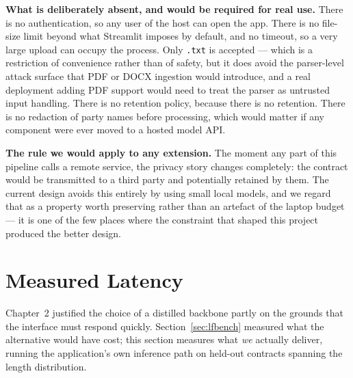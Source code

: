 \textbf{What is deliberately absent, and would be required for real use.} There is no authentication, so any user of the host can open the app. There is no file-size limit beyond what Streamlit imposes by default, and no timeout, so a very large upload can occupy the process. Only \texttt{.txt} is accepted --- which is a restriction of convenience rather than of safety, but it does avoid the parser-level attack surface that PDF or DOCX ingestion would introduce, and a real deployment adding PDF support would need to treat the parser as untrusted input handling. There is no retention policy, because there is no retention. There is no redaction of party names before processing, which would matter if any component were ever moved to a hosted model API.

\textbf{The rule we would apply to any extension.} The moment any part of this pipeline calls a remote service, the privacy story changes completely: the contract would be transmitted to a third party and potentially retained by them. The current design avoids this entirely by using small local models, and we regard that as a property worth preserving rather than an artefact of the laptop budget --- it is one of the few places where the constraint that shaped this project produced the better design.

\section{Measured Latency}
\label{sec:appbench}
Chapter~2 justified the choice of a distilled backbone partly on the grounds that the interface must respond quickly. Section~\ref{sec:lfbench} measured what the alternative would have cost; this section measures what \emph{we} actually deliver, running the application's own inference path on held-out contracts spanning the length distribution.

